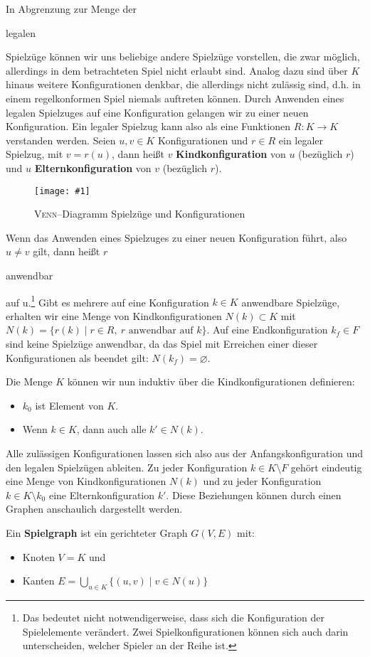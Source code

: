 \documentclass[a4paper,twoside]{scrartcl}
\let\emptyset\varnothing
\newcommand\e[1]{\begin{em}#1\end{em}}
\newcommand\g[3]{%
  \begin{figure}[!ht]
  \centering
  \texttt{[image: \#1]}
  \caption{#2}
  \end{figure}}
\begin{document}
In Abgrenzung zur Menge der \e{legalen} Spielzüge können wir uns beliebige andere Spielzüge vorstellen, die zwar möglich, allerdings in dem betrachteten Spiel nicht erlaubt sind. Analog dazu sind über $K$ hinaus weitere Konfigurationen denkbar, die allerdings nicht zulässig sind, d.h. in einem regelkonformen Spiel niemals auftreten können. Durch Anwenden eines legalen Spielzuges auf eine Konfiguration gelangen wir zu einer neuen Konfiguration. Ein legaler Spielzug kann also als eine Funktionen $R:K \to K$ verstanden werden. Seien $u,v \in K$ Konfigurationen und $r \in R$ ein legaler Spielzug, mit $v = r(u)$, dann heißt $v$ \textbf{Kindkonfiguration} von $u$ (bezüglich $r$) und $u$ \textbf{Elternkonfiguration} von $v$ (bezüglich $r$). 

\g{img/spielzuege.pdf}{\textsc{Venn}--Diagramm Spielzüge und Konfigurationen}{0.8}

Wenn das Anwenden eines Spielzuges zu einer neuen Konfiguration führt, also $u \neq v$ gilt, dann heißt $r$ \e{anwendbar} auf u.\footnote{Das bedeutet nicht notwendigerweise, dass sich die Konfiguration der Spielelemente verändert. Zwei Spielkonfigurationen können sich auch darin unterscheiden, welcher Spieler an der Reihe ist.} Gibt es mehrere auf eine Konfiguration $k \in K$ anwendbare Spielzüge, erhalten wir eine Menge von Kindkonfigurationen $N(k) \subset K$ mit $N(k) = \{r(k) \mid r \in R,~r \textrm{ anwendbar auf } k\}$. Auf eine Endkonfiguration $k_f \in F$ sind keine Spielzüge anwendbar, da das Spiel mit Erreichen einer dieser Konfigurationen als beendet gilt: $N(k_f) = \emptyset$.

Die Menge $K$ können wir nun induktiv über die Kindkonfigurationen definieren: 
\begin{itemize}
	\item $k_0$ ist Element von $K$.
	\item Wenn $k \in K$, dann auch alle $k' \in N(k)$.
\end{itemize}

Alle zulässigen Konfigurationen lassen sich also aus der Anfangskonfiguration und den legalen Spielzügen ableiten. Zu jeder Konfiguration $k \in K \setminus F$ gehört eindeutig eine Menge von Kindkonfigurationen $N(k)$ und zu jeder Konfiguration $k \in K \setminus k_0$ eine Elternkonfiguration $k'$. Diese Beziehungen können durch einen Graphen anschaulich dargestellt werden.

Ein \textbf{Spielgraph} ist ein gerichteter Graph $G(V,E)$ mit: 
\begin{itemize}
	\item Knoten $V = K$ und
	\item Kanten $E = \bigcup\limits_{u \in K}\{(u,v) \mid v \in N(u)\}$
\end{itemize}
\end{document}
